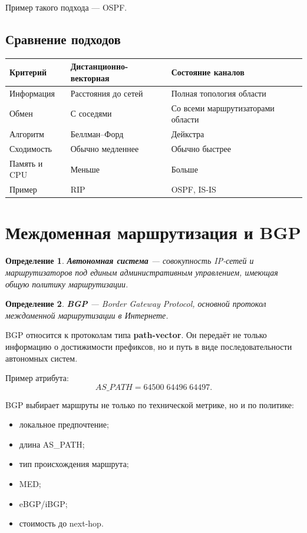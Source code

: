 \documentclass[12pt,a4paper]{article}
\newtheorem{definition}{Определение}
\begin{document}
Пример такого подхода --- OSPF.

\subsection{Сравнение подходов}

\begin{center}
\begin{tabular}{|p{}|p{}|p{}|}
\hline
\textbf{Критерий} & \textbf{Дистанционно-векторная} & \textbf{Состояние каналов} \\
\hline
Информация & Расстояния до сетей & Полная топология области \\
\hline
Обмен & С соседями & Со всеми маршрутизаторами области \\
\hline
Алгоритм & Беллман--Форд & Дейкстра \\
\hline
Сходимость & Обычно медленнее & Обычно быстрее \\
\hline
Память и CPU & Меньше & Больше \\
\hline
Пример & RIP & OSPF, IS-IS \\
\hline
\end{tabular}
\end{center}

\section{Междоменная маршрутизация и BGP}

\begin{definition}
\textbf{Автономная система} --- совокупность IP-сетей и маршрутизаторов под единым административным управлением, имеющая общую политику маршрутизации.
\end{definition}

\begin{definition}
\textbf{BGP} --- Border Gateway Protocol, основной протокол междоменной маршрутизации в Интернете.
\end{definition}

BGP относится к протоколам типа \textbf{path-vector}. Он передаёт не только информацию о достижимости префиксов, но и путь в виде последовательности автономных систем.

Пример атрибута:
\[
AS\_PATH = 64500\; 64496\; 64497.
\]

BGP выбирает маршруты не только по технической метрике, но и по политике:
\begin{itemize}
    \item локальное предпочтение;
    \item длина AS\_PATH;
    \item тип происхождения маршрута;
    \item MED;
    \item eBGP/iBGP;
    \item стоимость до next-hop.
\end{itemize}
\end{document}
